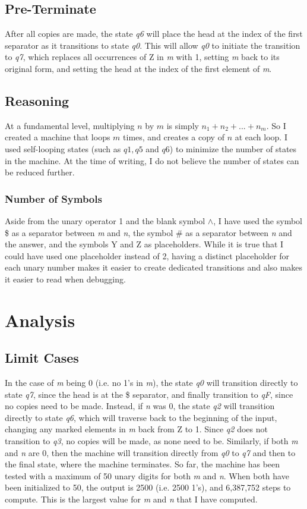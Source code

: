 \documentclass[a4paper,12pt]{article}
\begin{document}
\subsection{Pre-Terminate}
After all copies are made, the state \textit{q6} will place the head at the index of the first separator as it transitions to state \textit{q0}. This will allow \textit{q0} to initiate the transition to \textit{q7}, which replaces all occurrences of Z in \textit{m} with 1, setting \textit{m} back to its original form, and setting the head at the index of the first element of \textit{m}.

\subsection{Reasoning}
At a fundamental level, multiplying $n$ by $m$ is simply $n_1 + n_2 +... + n_m$. So I created a machine that loops $m$ times, and creates a copy of $n$ at each loop. I used self-looping states (such as $q1, q5$ and $q6$) to minimize the number of states in the machine. At the time of writing, I do not believe the number of states can be reduced further.

\subsubsection{Number of Symbols}
Aside from the unary operator 1 and the blank symbol $\land$, I have used the symbol \$ as a separator between \textit{m} and \textit{n}, the symbol \# as a separator between \textit{n} and the answer, and the symbols Y and Z as placeholders.
While it is true that I could have used one placeholder instead of 2, having a distinct placeholder for each unary number makes it easier to create dedicated transitions and also makes it easier to read when debugging. 

\section{Analysis}
\subsection{Limit Cases}
In the case of \textit{m} being 0 (i.e. no 1's in \textit{m}), the state \textit{q0} will transition directly to state \textit{q7}, since the head is at the \$ separator, and finally transition to \textit{qF}, since no copies need to be made.
Instead, if \textit{n} was 0, the state \textit{q2} will transition directly to state \textit{q6}, which will traverse back to the beginning of the input, changing any marked elements in \textit{m} back from Z to 1. Since \textit{q2} does not transition to \textit{q3}, no copies will be made, as none need to be. Similarly, if both \textit{m} and \textit{n} are 0, then the machine will transition directly from \textit{q0} to \textit{q7} and then to the final state, where the machine terminates.
So far, the machine has been tested with a maximum of 50 unary digits for both \textit{m} and \textit{n}. When both have been initialized to 50, the output is 2500 (i.e. 2500 1's), and 6,387,752 steps to compute. This is the largest value for \textit{m} and \textit{n} that I have computed.
\newpage
\end{document}
